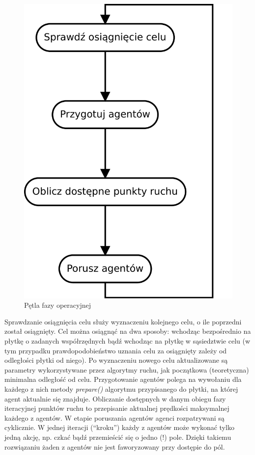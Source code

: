 \documentclass[a4paper, 12pt]{article}
\begin{document}
    \begin{figure}[H]
        \centering
        \includegraphics[scale=0.3]{./img/OperationalLoop.pdf}
        \caption{Pętla fazy operacyjnej}
        \label{fig:operloop}
    \end{figure}

\indent Sprawdzanie osiągnięcia celu służy wyznaczeniu kolejnego celu, o ile poprzedni został osiągnięty. Cel można osiągnąć na dwa sposoby: wchodząc bezpośrednio na płytkę o zadanych współrzędnych bądź wchodząc na płytkę w sąsiedztwie celu (w tym przypadku prawdopodobieństwo uznania celu za osiągnięty zależy od odległości płytki od niego). Po wyznaczeniu nowego celu aktualizowane są parametry wykorzystywane przez algorytmy ruchu, jak początkowa (teoretyczna) minimalna odległość od celu. \newline
\indent Przygotowanie agentów polega na wywołaniu dla każdego z nich metody \emph{prepare()} algorytmu przypisanego do płytki, na której agent aktualnie się znajduje. \newline
\indent Obliczanie dostępnych w danym obiegu fazy iteracyjnej punktów ruchu to przepisanie aktualnej prędkości maksymalnej każdego z agentów. \newline
\indent W etapie poruszania agentów agenci rozpatrywani są cyklicznie. W jednej iteracji (``kroku'') każdy z agentów może wykonać tylko jedną akcję,  np. czkać bądź przemieścić się o jedno (!) pole. Dzięki takiemu rozwiązaniu żaden z agentów nie jest faworyzowany przy dostępie do pól.
\end{document}
